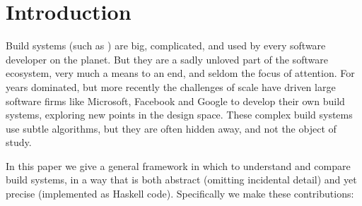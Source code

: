 \section{Introduction}\label{sec-intro}

Build systems (such as \Make) are big, complicated, and used by every
software developer on the planet.  But they are a sadly unloved part
of the software ecosystem, very much a means to an end, and seldom the
focus of attention.
For years \Make dominated, but more recently the challenges of scale have driven
large software firms like Microsoft, Facebook and Google to develop their own
build systems, exploring new points in the design space. These complex build
systems use subtle algorithms, but they are often hidden away, and not the
object of study.

In this paper we give a general framework in which to understand and compare
build systems, in a way that is both abstract (omitting incidental detail) and
yet precise (implemented as Haskell code). Specifically we make these
contributions:

